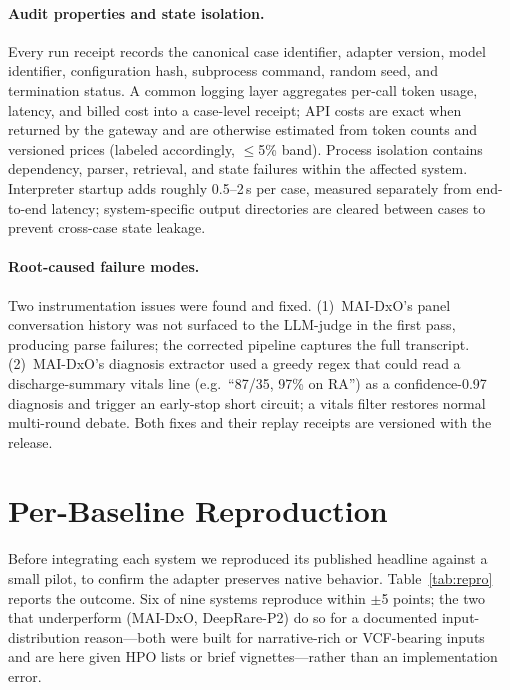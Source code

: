 \documentclass[letterpaper]{article} %
\begin{document}
\paragraph{Audit properties and state isolation.}
Every run receipt records the canonical case identifier, adapter version, model
identifier, configuration hash, subprocess command, random seed, and
termination status. A common logging layer aggregates per-call token usage,
latency, and billed cost into a case-level receipt; API costs are exact when
returned by the gateway and are otherwise estimated from token counts and
versioned prices (labeled accordingly, $\leq$5\% band). Process isolation
contains dependency, parser, retrieval, and state failures within the affected
system. Interpreter startup adds roughly 0.5--2\,s per case, measured separately
from end-to-end latency; system-specific output directories are cleared between
cases to prevent cross-case state leakage.

\paragraph{Root-caused failure modes.}
Two instrumentation issues were found and fixed. (1)~MAI-DxO's panel
conversation history was not surfaced to the LLM-judge in the first pass,
producing parse failures; the corrected pipeline captures the full transcript.
(2)~MAI-DxO's diagnosis extractor used a greedy regex that could read a
discharge-summary vitals line (e.g.\ ``87/35, 97\% on RA'') as a
confidence-0.97 diagnosis and trigger an early-stop short circuit; a vitals
filter restores normal multi-round debate. Both fixes and their replay receipts
are versioned with the release.

\section{Per-Baseline Reproduction}
\label{app:repro}

Before integrating each system we reproduced its published headline against a
small pilot, to confirm the adapter preserves native behavior.
Table~\ref{tab:repro} reports the outcome. Six of nine systems reproduce within
$\pm$5 points; the two that underperform (MAI-DxO, DeepRare-P2) do so for a
documented input-distribution reason---both were built for narrative-rich or
VCF-bearing inputs and are here given HPO lists or brief vignettes---rather than
an implementation error.
\end{document}
